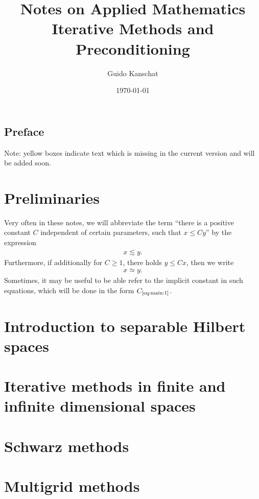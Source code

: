 \documentclass[USenglish]{report}
\title{\textbf{Notes on Applied Mathematics}
\\[5mm]
{\large Iterative Methods and Preconditioning}}
\author{Guido Kanschat}
\date{\today}
\def\constref#1{C_{\text{\ref{#1}}}}
\begin{document}
\maketitle

\section*{Preface}

\thispagestyle{empty}
\begin{todo}
  Note: yellow boxes indicate text which is missing in the current
  version and will be added soon.
\end{todo}
\setcounter{page}{0}

\tableofcontents

\chapter{Preliminaries}

\begin{notation}
  Very often in these notes, we will abbreviate the term ``there is a
  positive constant $C$ independent of certain parameters, such that $x \le C
  y$'' by the expression
  \begin{gather}
    \label{eq:main:1}
    x \lesssim y.
  \end{gather}
  Furthermore, if additionally for $C\ge 1$, there holds  $y \le Cx$,
  then we write
  \begin{gather*}
    x \simeq y.
  \end{gather*}
  Sometimes, it may be useful to be able refer to the implicit
  constant in such equations, which will be done in the form  $\constref{eq:main:1}$.
\end{notation}

\chapter{Introduction to separable Hilbert spaces}


\chapter{Iterative methods in finite and infinite dimensional spaces}





\chapter{Schwarz methods}
\label{cha:iteration:schwarz-methods}


\chapter{Multigrid methods}
\label{cha:iteration:multigrid-methods}


\end{document}
